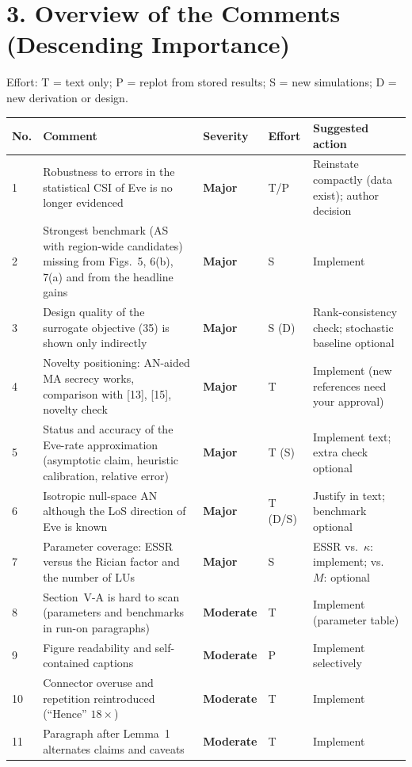 \documentclass[10.5pt,a4paper]{article}
\newcommand{\Major}{\textcolor{BrickRed}{\textbf{Major}}}
\newcommand{\Moderate}{\textcolor{BurntOrange}{\textbf{Moderate}}}
\begin{document}
\section*{3. Overview of the Comments (Descending Importance)}
Effort: T = text only; P = replot from stored results; S = new simulations; D = new derivation or design.
\begin{center}\small
\begin{longtable}{>{\raggedright}p{0.5cm}>{\raggedright}p{7.2cm}>{\raggedright}p{1.55cm}>{\raggedright}p{0.9cm}>{\raggedright\arraybackslash}p{3.9cm}}
\toprule
No. & Comment & Severity & Effort & Suggested action \\ \midrule
\endhead
1 & Robustness to errors in the statistical CSI of Eve is no longer evidenced & \Major & T/P & Reinstate compactly (data exist); author decision \\
2 & Strongest benchmark (AS with region-wide candidates) missing from Figs.~5, 6(b), 7(a) and from the headline gains & \Major & S & Implement \\
3 & Design quality of the surrogate objective (35) is shown only indirectly & \Major & S (D) & Rank-consistency check; stochastic baseline optional \\
4 & Novelty positioning: AN-aided MA secrecy works, comparison with [13], [15], novelty check & \Major & T & Implement (new references need your approval) \\
5 & Status and accuracy of the Eve-rate approximation (asymptotic claim, heuristic calibration, relative error) & \Major & T (S) & Implement text; extra check optional \\
6 & Isotropic null-space AN although the LoS direction of Eve is known & \Major & T (D/S) & Justify in text; benchmark optional \\
7 & Parameter coverage: ESSR versus the Rician factor and the number of LUs & \Major & S & ESSR vs.\ $\kappa$: implement; vs.\ $M$: optional \\
8 & Section~V-A is hard to scan (parameters and benchmarks in run-on paragraphs) & \Moderate & T & Implement (parameter table) \\
9 & Figure readability and self-contained captions & \Moderate & P & Implement selectively \\
10 & Connector overuse and repetition reintroduced (``Hence'' $18\times$) & \Moderate & T & Implement \\
11 & Paragraph after Lemma~1 alternates claims and caveats & \Moderate & T & Implement \\

\end{longtable}
\end{center}
\end{document}
